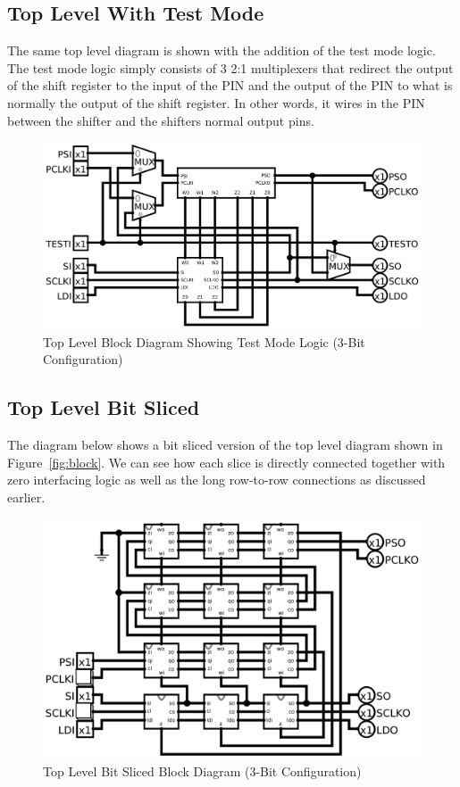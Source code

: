     \subsection{Top Level With Test Mode }
    The same top level diagram is shown with the addition of the test
    mode logic. The test mode logic simply consists of 3 2:1 multiplexers that
    redirect the output of the shift register to the input of the PIN and the
    output of the PIN to what is normally the output of the shift register. In
    other words, it wires in the PIN between the shifter and the shifters
    normal output pins.
    \begin{figure}[H]
        \centering
        \includegraphics[width=0.9\linewidth]{../../logisim/test_mode.png}
        \caption{Top Level Block Diagram Showing Test Mode Logic (3-Bit Configuration)}
    \end{figure}

    \subsection{Top Level Bit Sliced}
    The diagram below shows a bit sliced version of the top level diagram shown
    in Figure~\ref{fig:block}. We can see how each slice is directly connected
    together with zero interfacing logic as well as the long row-to-row
    connections as discussed earlier.
    \vspace{2\baselineskip}
    \begin{figure}[H]
        \centering
        \includegraphics[width=\linewidth]{../../logisim/top_internal.png}
        \caption{Top Level Bit Sliced Block Diagram (3-Bit Configuration)}
    \end{figure}


